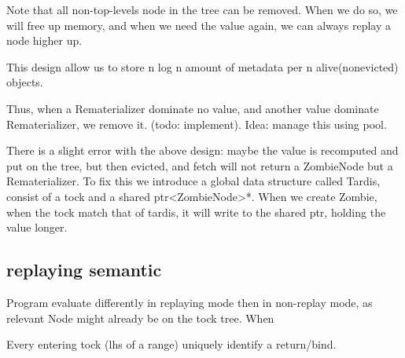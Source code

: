 Note that all non-top-levels node in the tree can be removed. When we do so, we will free up memory, and when we need the value again, we can always replay a node higher up.

This design allow us to store n log n amount of metadata per n alive(nonevicted) objects.

Thus, when a Rematerializer dominate no value, and another value dominate Rematerializer, we remove it. (todo: implement). Idea: manage this using pool.

There is a slight error with the above design: maybe the value is recomputed and put on the tree, but then evicted, and fetch will not return a ZombieNode but a Rematerializer. To fix this we introduce a global data structure called Tardis, consist of a tock and a shared ptr<ZombieNode>*. When we create Zombie, when the tock match that of tardis, it will write to the shared ptr, holding the value longer.

\subsection{replaying semantic}
Program evaluate differently in replaying mode then in non-replay mode, as relevant Node might already be on the tock tree. When 

Every entering tock (lhs of a range) uniquely identify a return/bind.

